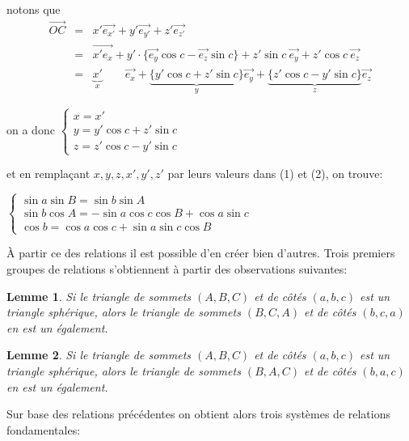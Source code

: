 \documentclass[12pt]{report}
\newtheorem{lemma}{Lemme}
\begin{document}
notons que 
\begin{eqnarray*}
\vec {OC} &=& x' \vec{e_{x'}} + y' \vec{e_{y'}} + z' \vec{e_{z'}}\\
&=& \vec{x'e_x} + y' \cdot \{\vec{e_y} \cos c - \vec{e_z} \sin c \} + z' \sin c \ \vec{e_y} + z' \cos c \ \vec{e_z} \\
&=& \underbrace{x'}_x \qquad \vec{e_x} + \underbrace{\{y' \cos c + z' \sin c\}}_y \vec{e_y} + \underbrace{\{z' \cos c - y' \sin c\}}_z \vec {e_z}
\end{eqnarray*}


on a donc $\left\{\begin{array}{lll} x=x'\\ y = y' \cos c + z' \sin c \\
z = z' \cos c - y' \sin c \end{array}\right.$ 
\bigskip

et en remplaçant $x,y,z,x',y',z'$ par leurs valeurs dans (1) et (2), on trouve:

\bigskip

$\left\{\begin{array}{lll}
\sin a \sin B = \sin b \sin A \\
\sin b \cos A = -\sin a \cos c \cos B + \cos a \sin c \\
\cos b = \cos a \cos c + \sin a \sin c \cos B
\end{array}
\right.
$

\bigskip\bigskip

À partir ce des relations il est possible d'en créer bien d'autres.  Trois premiers groupes de relations
s'obtiennent à partir des observations suivantes:

\begin{lemma}
Si le triangle de sommets $(A,B,C)$ et de côtés $(a,b,c)$ est un triangle sphérique, alors
   le triangle de sommets $(B,C,A)$ et de côtés $(b,c,a)$ en est un \'egalement. 
\end{lemma}

\begin{lemma}
Si le triangle de sommets $(A,B,C)$ et de côtés $(a,b,c)$ est un triangle sphérique, alors
   le triangle de sommets $(B,A,C)$ et de côtés $(b,a,c)$ en est un \'egalement. 
\end{lemma}


Sur base des relations précédentes on 
obtient alors trois systèmes de relations fondamentales:

\bigskip


\bigskip
\end{document}
